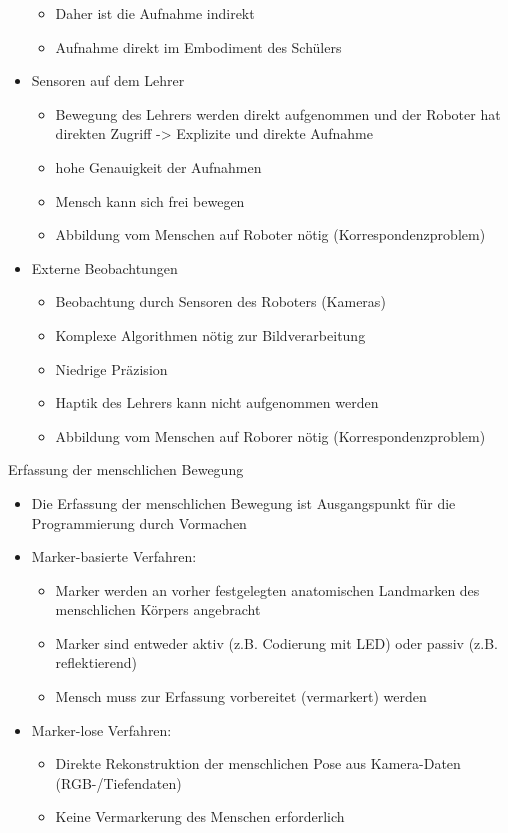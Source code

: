 \documentclass[paper=a4, fontsize=11pt]{scrartcl} %
\numberwithin{equation}{section} %
\numberwithin{figure}{section} %
\numberwithin{table}{section} %
\begin{document}
\begin{itemize}
\begin{itemize}
\item Daher ist die Aufnahme indirekt
\item Aufnahme direkt im Embodiment des Schülers
\end{itemize}
\item Sensoren auf dem Lehrer
\begin{itemize}
\item Bewegung des Lehrers werden direkt aufgenommen und der Roboter hat direkten Zugriff -> Explizite und direkte Aufnahme
\item hohe Genauigkeit der Aufnahmen
\item Mensch kann sich frei bewegen
\item Abbildung vom Menschen auf Roboter nötig (Korrespondenzproblem)
\end{itemize}
\item Externe Beobachtungen
\begin{itemize}
\item Beobachtung durch Sensoren des Roboters (Kameras)
\item Komplexe Algorithmen nötig zur Bildverarbeitung
\item Niedrige Präzision
\item Haptik des Lehrers kann nicht aufgenommen werden
\item Abbildung vom Menschen auf Roborer nötig (Korrespondenzproblem)
\end{itemize}
\end{itemize}

Erfassung der menschlichen Bewegung
\begin{itemize}
\item Die Erfassung der menschlichen Bewegung ist Ausgangspunkt für die Programmierung durch Vormachen
\item Marker-basierte Verfahren:
\begin{itemize}
\item Marker werden an vorher festgelegten anatomischen Landmarken des menschlichen Körpers angebracht
\item Marker sind entweder aktiv (z.B. Codierung mit LED) oder passiv (z.B. reflektierend)
\item Mensch muss zur Erfassung vorbereitet (vermarkert) werden
\end{itemize}
\item Marker-lose Verfahren:
\begin{itemize}
\item Direkte Rekonstruktion der menschlichen Pose aus Kamera-Daten (RGB-/Tiefendaten)
\item Keine Vermarkerung des Menschen erforderlich
\end{itemize}
\end{itemize}
\end{document}
